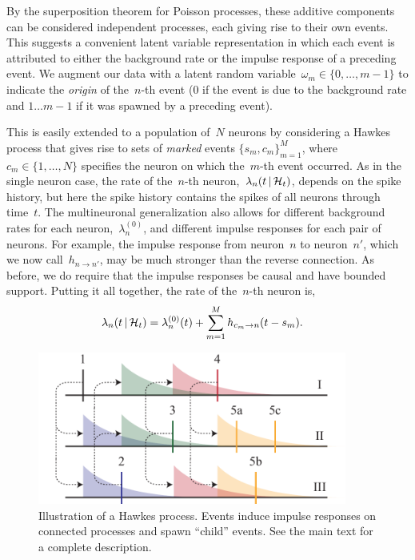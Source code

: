 By the superposition theorem for Poisson processes, these additive
components can be considered independent processes, each giving rise
to their own events.  This suggests a convenient latent variable
representation in which each event is attributed to either the
background rate or the impulse response of a preceding event.  We
augment our data with a latent random
variable~${\omega_m \in\{0,\ldots, m-1\}}$ to indicate the \emph{origin} of
the~$n$-th event ($0$ if the event is due to the background rate and
${1\ldots m-1}$ if it was spawned by a preceding event). 

This is easily extended to a population of~$N$ neurons by considering a Hawkes
process that gives rise to sets of
\emph{marked} events $\{s_m,c_m\}_{m=1}^M$,
where~${c_m\in\{1,\ldots,N\}}$ specifies the neuron on which
the~$m$-th event occurred.  As in the single neuron case, 
the rate of the~$n$-th neuron,~${\lambda_n(t\,|\,
  \mathcal{H}_t)}$,  depends on the spike history, but here the spike history 
contains the spikes of all neurons through time~$t$. 
The multineuronal generalization also allows for different background rates 
for each neuron,~$\lambda^{(0)}_{n}$, and  different impulse 
responses for each pair of neurons. For example, the impulse 
response from neuron~$n$ to neuron~$n'$, which we now call~$h_{n \to n'}$, 
may be much stronger than the reverse connection. As before, we
do require that the impulse responses be causal and have bounded support.
Putting it all together, the rate of the~$n$-th neuron is,
\begin{align}
  \label{eq:hawkes_rate}
  \lambda_n(t \,|\, \mathcal{H}_t)
  &= \lambda^{(0)}_{n}(t) + \sum_{m=1}^M h_{c_m \to n}(t - s_m).
\end{align}

\begin{figure}[t]
\centering%
\includegraphics[width=4in]{figures/ch2/Hawkes-wide} 
\vspace{-0.25cm}
\caption[Illustration of a Hawkes process]{Illustration of a Hawkes
  process. Events induce impulse responses on connected processes and
  spawn ``child'' events. See the main text for a complete
  description.}
\label{fig:hawkes}
\end{figure}

